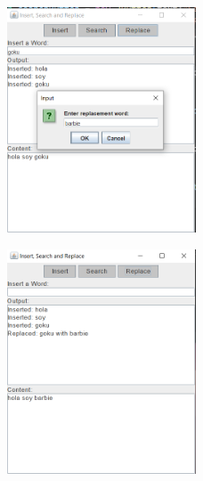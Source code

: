 \documentclass{article}
\begin{document}
\begin{itemize}
		\begin{figure}[H]
		\centering
		\includegraphics[width=0.5\textwidth, height=0.5\textwidth,keepaspectratio]{pruebas/replace1.png}
		\end{figure}
		\begin{figure}[H]
		\centering
		\includegraphics[width=0.5\textwidth, height=0.5\textwidth,keepaspectratio]{pruebas/replace2.png}
		\end{figure}
		\clearpage
		

	\end{itemize}
	
\end{document}
